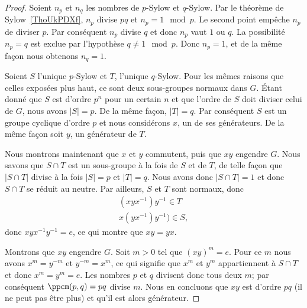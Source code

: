 \begin{proof}
	Soient \( n_p\) et \( n_q\) les nombres de \( p\)-Sylow et \( q\)-Sylow. Par le théorème de Sylow~\ref{ThoUkPDXf}, \( n_p\) divise \( pq\) et \( n_p=1\mod p\). Le second point empêche \( n_p\) de diviser \( p\). Par conséquent \( n_p\) divise \( q\) et donc \( n_p\) vaut \( 1\) ou \( q\). La possibilité \( n_p=q\) est exclue par l'hypothèse \( q\neq 1\mod p\). Donc \( n_p=1\), et de la même façon nous obtenons \( n_q=1\).

	Soient \( S\) l'unique \( p\)-Sylow et \( T\), l'unique \( q\)-Sylow. Pour les mêmes raisons que celles exposées plus haut, ce sont deux sous-groupes normaux dans \( G\). Étant donné que \( S\) est d'ordre \( p^n\) pour un certain \( n\) et que l'ordre de \( S\) doit diviser celui de \( G\), nous avons \( |S|=p\). De la même façon, \( | T |=q\). Par conséquent \( S\) est un groupe cyclique d'ordre \( p\) et nous considérons \( x\), un de ses générateurs. De la même façon soit \( y\), un générateur de \( T\).

	Nous montrons maintenant que \( x\) et \( y\) commutent, puis que \( xy\) engendre \( G\). Nous savons que \( S\cap T\) est un sous-groupe à la fois de \( S\) et de \( T\), de telle façon que \( | S\cap T |\) divise à la fois \( | S |=p\) et \( | T |=q\). Nous avons donc \( | S\cap T |=1\) et donc \( S\cap T\) se réduit au neutre. Par ailleurs, \( S\) et \( T\) sont normaux, donc
	\begin{subequations}
		\begin{align}
			(xyx^{-1})y^{-1}\in T \\
			x(yx^{-1})y^{-1})\in S,
		\end{align}
	\end{subequations}
	donc \( xyx^{-1}y^{-1}=e\), ce qui montre que \( xy=yx\).

	Montrons que \( xy\) engendre \( G\). Soit \( m>0\) tel que \( (xy)^m=e\). Pour ce \( m\) nous avons \( x^m=y^{-m}\) et \( y^{-m}=x^m\), ce qui signifie que \( x^m\) et \( y^m\) appartiennent à \( S\cap T\) et donc \( x^m=y^m=e\). Les nombres \( p\) et \( q\) divisent donc tous deux \( m\); par conséquent \( \ppcm(p,q)=pq\) divise \( m\). Nous en concluons que \( xy\) est d'ordre \( pq\) (il ne peut pas être plus) et qu'il est alors générateur.


\end{proof}
